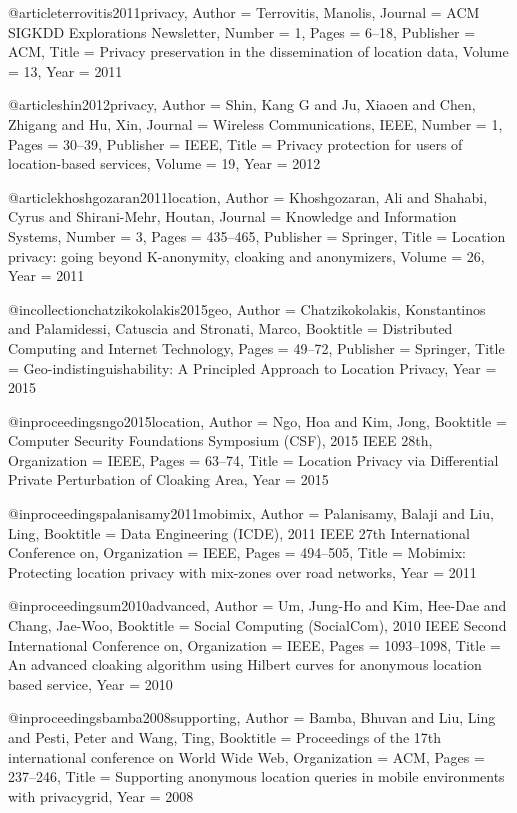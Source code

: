 {{{{{	@article{terrovitis2011privacy,
	Author = {Terrovitis, Manolis},
	Journal = {ACM SIGKDD Explorations Newsletter},
	Number = {1},
	Pages = {6--18},
	Publisher = {ACM},
	Title = {Privacy preservation in the dissemination of location data},
	Volume = {13},
	Year = {2011}}
	
	@article{shin2012privacy,
	Author = {Shin, Kang G and Ju, Xiaoen and Chen, Zhigang and Hu, Xin},
	Journal = {Wireless Communications, IEEE},
	Number = {1},
	Pages = {30--39},
	Publisher = {IEEE},
	Title = {Privacy protection for users of location-based services},
	Volume = {19},
	Year = {2012}}
	
	@article{khoshgozaran2011location,
	Author = {Khoshgozaran, Ali and Shahabi, Cyrus and Shirani-Mehr, Houtan},
	Journal = {Knowledge and Information Systems},
	Number = {3},
	Pages = {435--465},
	Publisher = {Springer},
	Title = {Location privacy: going beyond K-anonymity, cloaking and anonymizers},
	Volume = {26},
	Year = {2011}}
	
	@incollection{chatzikokolakis2015geo,
	Author = {Chatzikokolakis, Konstantinos and Palamidessi, Catuscia and Stronati, Marco},
	Booktitle = {Distributed Computing and Internet Technology},
	Pages = {49--72},
	Publisher = {Springer},
	Title = {Geo-indistinguishability: A Principled Approach to Location Privacy},
	Year = {2015}}
	
	@inproceedings{ngo2015location,
	Author = {Ngo, Hoa and Kim, Jong},
	Booktitle = {Computer Security Foundations Symposium (CSF), 2015 IEEE 28th},
	Organization = {IEEE},
	Pages = {63--74},
	Title = {Location Privacy via Differential Private Perturbation of Cloaking Area},
	Year = {2015}}
	
	@inproceedings{palanisamy2011mobimix,
	Author = {Palanisamy, Balaji and Liu, Ling},
	Booktitle = {Data Engineering (ICDE), 2011 IEEE 27th International Conference on},
	Organization = {IEEE},
	Pages = {494--505},
	Title = {Mobimix: Protecting location privacy with mix-zones over road networks},
	Year = {2011}}
	
	@inproceedings{um2010advanced,
	Author = {Um, Jung-Ho and Kim, Hee-Dae and Chang, Jae-Woo},
	Booktitle = {Social Computing (SocialCom), 2010 IEEE Second International Conference on},
	Organization = {IEEE},
	Pages = {1093--1098},
	Title = {An advanced cloaking algorithm using Hilbert curves for anonymous location based service},
	Year = {2010}}
	
	@inproceedings{bamba2008supporting,
	Author = {Bamba, Bhuvan and Liu, Ling and Pesti, Peter and Wang, Ting},
	Booktitle = {Proceedings of the 17th international conference on World Wide Web},
	Organization = {ACM},
	Pages = {237--246},
	Title = {Supporting anonymous location queries in mobile environments with privacygrid},
	Year = {2008}}
	
}}}}}
